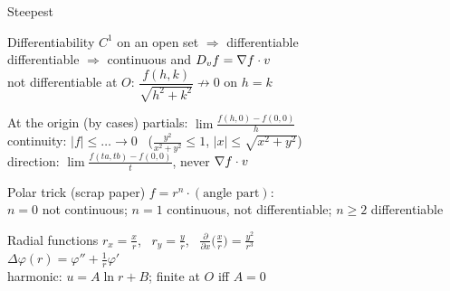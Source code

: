 \begin{tcbraster}[raster columns=2, raster equal height=rows, raster column skip=3mm, raster row skip=3mm]
\begin{fsheet}{Steepest}
\end{fsheet}
\begin{fsheet}{Differentiability}
$C^1$ on an open set $\Rightarrow$ differentiable\\
differentiable $\Rightarrow$ continuous and $D_vf=\nabla f\cdot v$\\
not differentiable at $O$: $\dfrac{f(h,k)}{\sqrt{h^2+k^2}}\not\to0$ on $h=k$
\end{fsheet}
\begin{fsheet}{At the origin (by cases)}
partials: $\lim\frac{f(h,0)-f(0,0)}{h}$\\
continuity: $|f|\le\ldots\to0$ \ ($\frac{y^2}{x^2+y^2}\le1$, $|x|\le\sqrt{x^2+y^2}$)\\
direction: $\lim\frac{f(ta,tb)-f(0,0)}{t}$, never $\nabla f\cdot v$
\end{fsheet}
\begin{fsheet}{Polar trick (scrap paper)}
$f=r^n\cdot(\text{angle part})$:\\
$n=0$ not continuous; $n=1$ continuous, not differentiable; $n\ge2$ differentiable
\end{fsheet}
\begin{fsheet}{Radial functions}
$r_x=\frac xr$, \ $r_y=\frac yr$, \ $\frac{\partial}{\partial x}\big(\frac xr\big)=\frac{y^2}{r^3}$\\
$\Delta\varphi(r)=\varphi''+\frac1r\varphi'$\\
harmonic: $u=A\ln r+B$; finite at $O$ iff $A=0$
\end{fsheet}
\end{tcbraster}

